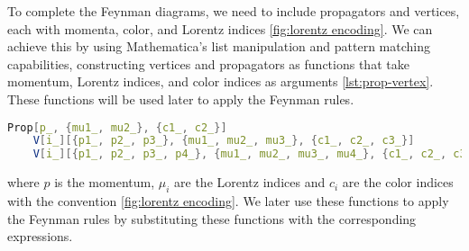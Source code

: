 \documentclass[main.tex]{subfiles}
\begin{document}
To complete the Feynman diagrams, we need to include propagators and vertices, each with momenta, color, and Lorentz indices \cref{fig:lorentz encoding}. 
We can achieve this by using Mathematica's list manipulation and pattern matching capabilities, constructing vertices and propagators as functions that take momentum, Lorentz indices, and color indices as arguments \cref{lst:prop-vertex}. 
These functions will be used later to apply the Feynman rules.

\begin{lstlisting}[language=Mathematica,caption = {Feynman propagator and vertex}, label = {lst:prop-vertex}]
    Prop[p_, {mu1_, mu2_}, {c1_, c2_}]
    V[i_][{p1_, p2_, p3_}, {mu1_, mu2_, mu3_}, {c1_, c2_, c3_}]
    V[i_][{p1_, p2_, p3_, p4_}, {mu1_, mu2_, mu3_, mu4_}, {c1_, c2_, c3_, c4_}]
\end{lstlisting}

where $p$ is the momentum, $\mu_i$ are the Lorentz indices and $c_i$ are the color indices with the convention \cref{fig:lorentz encoding}. 
We later use these functions to apply the Feynman rules by substituting these functions with the corresponding expressions.
\end{document}
